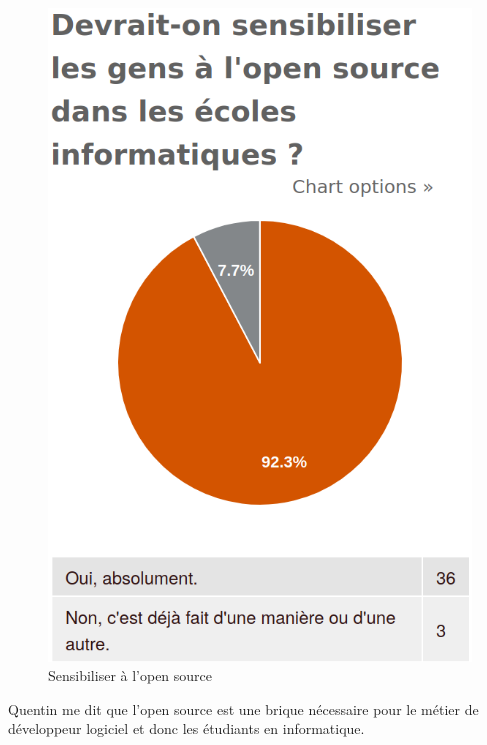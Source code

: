 				\begin{figure}[!htb]
					\center
					\includegraphics[scale=0.28]{./img/sensibiliser}
					\caption{Sensibiliser à l'open source}
				\end{figure}

				Quentin  me dit que l'open source est une brique nécessaire pour le métier de développeur logiciel et donc les étudiants en informatique.

				\begin{center}
					\textit{
					}
				\end{center}

